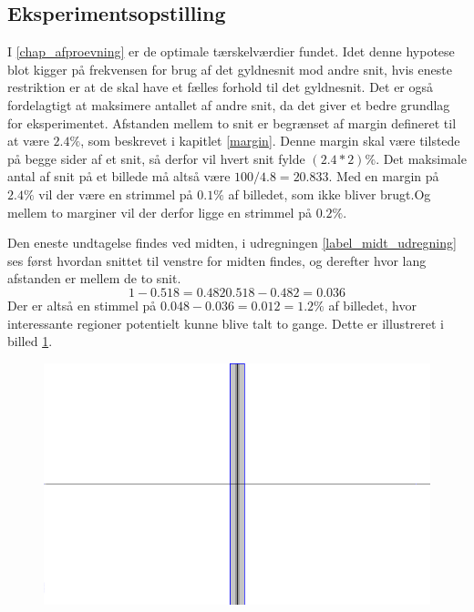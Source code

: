 {\subsection{Eksperimentsopstilling}
I \ref{chap_afproevning} er de optimale tærskelværdier fundet.  Idet
denne hypotese blot kigger på frekvensen for brug af det gyldnesnit mod
andre snit, hvis eneste restriktion er at de skal have et fælles forhold
til det gyldnesnit.  Det er også fordelagtigt at maksimere antallet af
andre snit, da det giver et bedre grundlag for eksperimentet.  Afstanden
mellem to snit er begrænset af margin defineret til at være
$2.4\%$, som beskrevet i kapitlet \ref{margin}.  Denne margin skal være tilstede på begge sider af
et snit, så derfor vil hvert snit fylde $(2.4*2)\%$.  Det maksimale
antal af snit på et billede må altså være $100/4.8=20.833$.
Med en margin på $2.4\%$ vil der være en strimmel på $0.1\%$ af
billedet, som ikke bliver brugt.Og mellem to marginer vil der derfor ligge en
strimmel på $0.2\%$. 

Den eneste undtagelse findes ved midten, i udregningen
\ref{label_midt_udregning} ses først hvordan snittet til venstre for
midten findes, og derefter hvor lang afstanden er mellem de to snit.
\begin{equation}\label{resul_midt_udregningen}
    1-0.518 = 0.482
    0.518-0.482 = 0.036
\end{equation}
Der er altså en stimmel på $0.048-0.036 = 0.012 = 1.2\%$ af
billedet, hvor interessante regioner potentielt kunne blive talt to gange.
Dette er illustreret i billed \ref{resultat_fejl_midt}.
\begin{figure}[!h]
	\centering
	\includegraphics[scale=0.5]{afsnit/resultater/billeder/midt_strimmel}
	\label{resultat_fejl_midt}
\end{figure}

}
